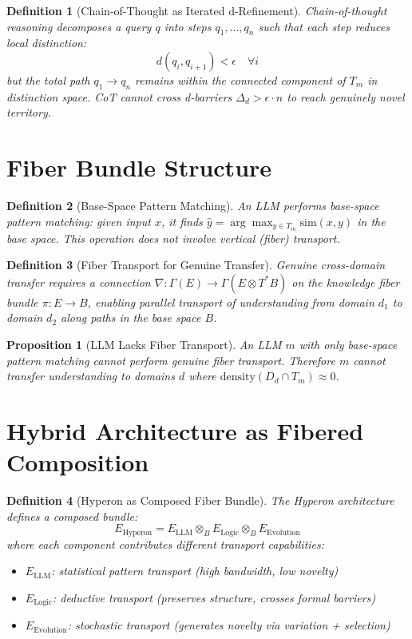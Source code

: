 \documentclass[11pt]{article}
\newtheorem{definition}{Definition}
\newtheorem{proposition}{Proposition}
\begin{document}
\begin{definition}[Chain-of-Thought as Iterated d-Refinement]
Chain-of-thought reasoning decomposes a query $q$ into steps
$q_1, \ldots, q_n$ such that each step reduces local distinction:
\[
  d(q_i, q_{i+1}) < \epsilon \quad \forall i
\]
but the total path $q_1 \to q_n$ remains within the connected component
of $T_m$ in distinction space. CoT cannot cross d-barriers
$\Delta_d > \epsilon \cdot n$ to reach genuinely novel territory.
\end{definition}

\section{Fiber Bundle Structure}

\begin{definition}[Base-Space Pattern Matching]
An LLM performs base-space pattern matching: given input $x$, it finds
$\hat{y} = \arg\max_{y \in T_m} \text{sim}(x, y)$ in the base space.
This operation does not involve vertical (fiber) transport.
\end{definition}

\begin{definition}[Fiber Transport for Genuine Transfer]
Genuine cross-domain transfer requires a connection
$\nabla: \Gamma(E) \to \Gamma(E \otimes T^*B)$ on the knowledge fiber
bundle $\pi: E \to B$, enabling parallel transport of understanding
from domain $d_1$ to domain $d_2$ along paths in the base space $B$.
\end{definition}

\begin{proposition}[LLM Lacks Fiber Transport]
An LLM $m$ with only base-space pattern matching cannot perform genuine
fiber transport. Therefore $m$ cannot transfer understanding to domains
$d$ where $\text{density}(D_d \cap T_m) \approx 0$.
\end{proposition}

\section{Hybrid Architecture as Fibered Composition}

\begin{definition}[Hyperon as Composed Fiber Bundle]
The Hyperon architecture defines a composed bundle:
\[
  E_{\text{Hyperon}} = E_{\text{LLM}} \otimes_{B} E_{\text{Logic}}
  \otimes_{B} E_{\text{Evolution}}
\]
where each component contributes different transport capabilities:
\begin{itemize}
  \item $E_{\text{LLM}}$: statistical pattern transport (high bandwidth, low novelty)
  \item $E_{\text{Logic}}$: deductive transport (preserves structure, crosses formal barriers)
  \item $E_{\text{Evolution}}$: stochastic transport (generates novelty via variation + selection)
\end{itemize}
\end{definition}
\end{document}
